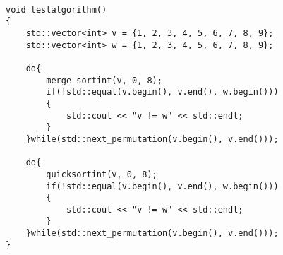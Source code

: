 \begin{lstlisting}

void testalgorithm()
{
    std::vector<int> v = {1, 2, 3, 4, 5, 6, 7, 8, 9};
    std::vector<int> w = {1, 2, 3, 4, 5, 6, 7, 8, 9};

    do{
        merge_sortint(v, 0, 8);
        if(!std::equal(v.begin(), v.end(), w.begin()))
        {
            std::cout << "v != w" << std::endl;
        }
    }while(std::next_permutation(v.begin(), v.end()));

    do{
        quicksortint(v, 0, 8);
        if(!std::equal(v.begin(), v.end(), w.begin()))
        {
            std::cout << "v != w" << std::endl;
        }
    }while(std::next_permutation(v.begin(), v.end()));    
}

\end{lstlisting}